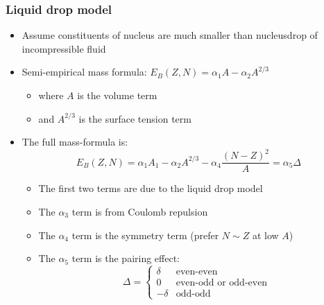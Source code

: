 \subsubsection{Liquid drop model}
\begin{itemize}
  \item Assume constituents of nucleus are much smaller than nucleus\thus drop of incompressible fluid
  \item \thus Semi-empirical mass formula: $E_B(Z,N) = \alpha_1 A - \alpha_2 A^{2/3}$
  \begin{itemize}
    \item where $A$ is the volume term
    \item and $A^{2/3}$ is the surface tension term
  \end{itemize}
  \item The full mass-formula is:
  \begin{equation}
    E_B(Z,N) = \alpha_1 A_1 - \alpha_2 A^{2/3} - \alpha_4 \frac{(N-Z)^2}{A} = \alpha_5 \Delta
  \end{equation}
  \begin{itemize}
    \item The first two terms are due to the liquid drop model
    \item The $\alpha_3$ term is from Coulomb repulsion
    \item The $\alpha_4$ term is the symmetry term (prefer $N\sim Z$ at low $A$)
    \item The $\alpha_5$ term is the pairing effect:
    \begin{equation}
      \Delta = \begin{cases} \delta & \text{even-even} \\ 0 &\text{even-odd or odd-even} \\ -\delta &\text{odd-odd} \end{cases}
    \end{equation}
  \end{itemize}
\end{itemize}

